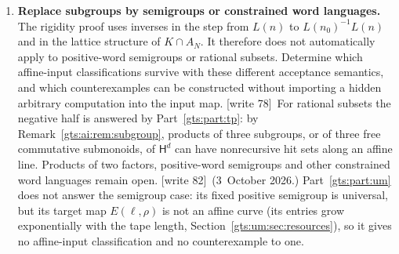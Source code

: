 \documentclass[11pt,letterpaper]{article}
\theoremstyle{definition}
\theoremstyle{remark}
\newcommand{\HH}{\mathsf H}
\newcommand{\wtagb}{\textup{[write 78]}}
\newcommand{\wtagc}{\textup{[write 82]}}
\begin{document}
\begin{enumerate}[label=\textbf{\arabic*.},leftmargin=*]
\item \textbf{Replace subgroups by semigroups or constrained word languages.}
The rigidity proof uses inverses in the step from $L(n)$ to $L(n_0)^{-1}L(n)$ and in the lattice structure of $K\cap A_N$. It therefore does not automatically apply to positive-word semigroups or rational subsets. Determine which affine-input classifications survive with these different acceptance semantics, and which counterexamples can be constructed without importing a hidden arbitrary computation into the input map.
\wtagb\ For rational subsets the negative half is answered by Part~\ref{gts:part:tp}: by Remark~\ref{gts:ai:rem:subgroup}, products of three subgroups, or of three free commutative submonoids, of $\HH^d$ can have nonrecursive hit sets along an affine line. Products of two factors, positive-word semigroups and other constrained word languages remain open.
\wtagc\ (3~October 2026.) Part~\ref{gts:part:um} does not answer the semigroup case: its fixed positive semigroup is universal, but its target map $E(\ell,\rho)$ is not an affine curve (its entries grow exponentially with the tape length, Section~\ref{gts:um:sec:resources}), so it gives no affine-input classification and no counterexample to one.


\end{enumerate}
\end{document}
